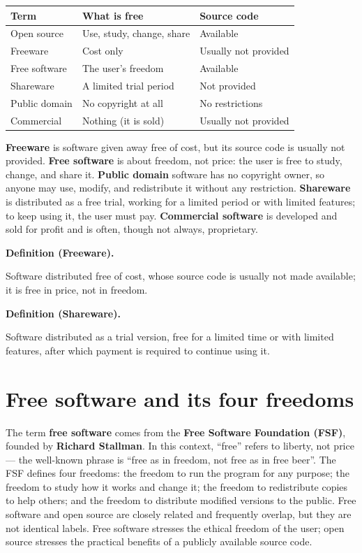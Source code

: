 \documentclass[11pt]{article}
\newenvironment{definitionbox}[1]{%
  \par\noindent\textbf{Definition (#1).}\ \itshape
}{\par\vspace{0.3em}}
\begin{document}
\begin{center}
\begin{tabular}{p{}p{}p{}}
\toprule
\textbf{Term} & \textbf{What is free} & \textbf{Source code} \\
\midrule
Open source & Use, study, change, share & Available \\
Freeware & Cost only & Usually not provided \\
Free software & The user's freedom & Available \\
Shareware & A limited trial period & Not provided \\
Public domain & No copyright at all & No restrictions \\
Commercial & Nothing (it is sold) & Usually not provided \\
\bottomrule
\end{tabular}
\end{center}

\textbf{Freeware} is software given away free of cost, but its source code is
usually not provided. \textbf{Free software} is about freedom, not price: the
user is free to study, change, and share it. \textbf{Public domain} software
has no copyright owner, so anyone may use, modify, and redistribute it without
any restriction. \textbf{Shareware} is distributed as a free trial, working
for a limited period or with limited features; to keep using it, the user must
pay. \textbf{Commercial software} is developed and sold for profit and is
often, though not always, proprietary.

\begin{definitionbox}{Freeware}
Software distributed free of cost, whose source code is usually not made
available; it is free in price, not in freedom.
\end{definitionbox}

\begin{definitionbox}{Shareware}
Software distributed as a trial version, free for a limited time or with
limited features, after which payment is required to continue using it.
\end{definitionbox}

\section{Free software and its four freedoms}
The term \textbf{free software} comes from the \textbf{Free Software
Foundation (FSF)}, founded by \textbf{Richard Stallman}. In this context,
``free'' refers to liberty, not price --- the well-known phrase is ``free as in
freedom, not free as in free beer''. The FSF defines four freedoms: the freedom
to run the program for any purpose; the freedom to study how it works and
change it; the freedom to redistribute copies to help others; and the freedom
to distribute modified versions to the public. Free software and open source
are closely related and frequently overlap, but they are not identical labels.
Free software stresses the ethical freedom of the user; open source stresses
the practical benefits of a publicly available source code.
\end{document}
